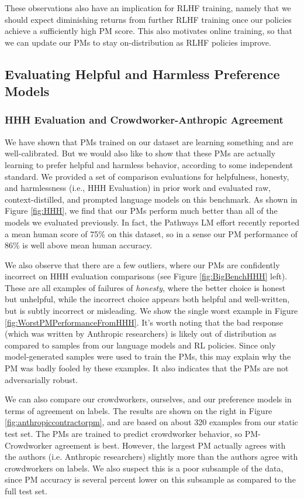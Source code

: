 These observations also have an implication for RLHF training, namely that we should expect diminishing returns from further RLHF training once our policies achieve a sufficiently high PM score.  This also motivates online training, so that we can update our PMs to stay on-distribution as RLHF policies improve.

\subsection{Evaluating Helpful and Harmless Preference Models}

\subsubsection{HHH Evaluation and Crowdworker-Anthropic Agreement}

We have shown that PMs trained on our dataset are learning something and are well-calibrated.  But we would also like to show that these PMs are actually learning to prefer helpful and harmless behavior, according to some independent standard.  We provided a set of comparison evaluations for helpfulness, honesty, and harmlessness (i.e., HHH Evaluation) in prior work  and evaluated raw, context-distilled, and prompted language models \cite{askell2021general} on this benchmark.  As shown in Figure \ref{fig:HHH}, we find that our PMs perform much better than all of the models we evaluated previously.  In fact, the Pathways LM effort \cite{PaLM}  recently reported a mean human score of 75\% on this dataset, so in a sense our PM performance of 86\% is well above mean human accuracy.

We also observe that there are a few outliers, where our PMs are confidently incorrect on HHH evaluation comparisons (see Figure \ref{fig:BigBenchHHH} left).  These are all examples of  failures of \emph{honesty}, where the better choice is honest but unhelpful, while the incorrect choice appears both helpful and well-written, but is subtly incorrect or misleading.  We show the single worst example in Figure \ref{fig:WorstPMPerformanceFromHHH}.   It's worth noting that the bad response (which was written by Anthropic researchers) is likely out of distribution as compared to samples from our language models and RL policies.  Since only model-generated samples were used to train the PMs, this may explain why the PM was badly fooled by these examples.  It also indicates that the PMs are not adversarially robust.

We can also compare our crowdworkers, ourselves, and our preference models in terms of agreement on labels.  The results are shown on the right in Figure \ref{fig:anthropiccontractorpm}, and are based on about 320 examples from our static test set.  The PMs are trained to predict crowdworker behavior, so PM-Crowdworker agreement is best.  However, the largest PM actually agrees with the authors (i.e. Anthropic researchers) slightly more than the authors agree with crowdworkers on labels.  We also suspect this is a poor subsample of the data, since PM accuracy is several percent lower on this subsample as compared to the full test set.

